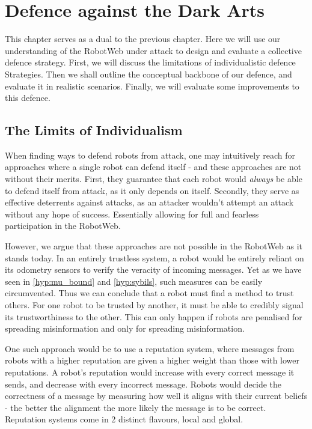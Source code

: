 \chapter{Defence against the Dark Arts}
This chapter serves as a dual to the previous chapter. Here we will use our understanding of the RobotWeb under attack to design and evaluate a collective defence strategy. First, we will discuss the limitations of individualistic defence Strategies. Then we shall outline the conceptual backbone of our defence, and evaluate it in realistic scenarios. Finally, we will evaluate some improvements to this defence.

\section{The Limits of Individualism}
When finding ways to defend robots from attack, one may intuitively reach for approaches where a single robot can defend itself - and these approaches are not without their merits. First, they guarantee that each robot would \textit{always} be able to defend itself from attack, as it only depends on itself. Secondly, they serve as effective deterrents against attacks, as an attacker wouldn't attempt an attack without any hope of success. Essentially allowing for full and fearless participation in the RobotWeb. 

However, we argue that these approaches are not possible in the RobotWeb as it stands today. In an entirely trustless system, a robot would be entirely reliant on its odometry sensors to verify the veracity of incoming messages. Yet as we have seen in \ref{hyp:mu_bound} and \ref{hyp:sybils}, such measures can be easily circumvented. Thus we can conclude that a robot must find a method to trust others. For one robot to be trusted by another, it must be able to credibly signal its trustworthiness to the other. This can only happen if robots are penalised for spreading misinformation and only for spreading misinformation.

One such approach would be to use a reputation system, where messages from robots with a higher reputation are given a higher weight than those with lower reputations. A robot's reputation would increase with every correct message it sends, and decrease with every incorrect message. Robots would decide the correctness of a message by measuring how well it aligns with their current beliefs - the better the alignment the more likely the message is to be correct. Reputation systems come in 2 distinct flavours, local and global. 

